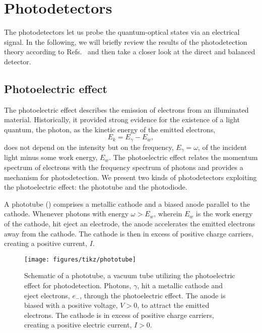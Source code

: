 \section{Photodetectors}\label{sec:photodetectors}

The photodetectors let us probe the quantum-optical states via an electrical signal.
In the following, we will briefly review the results of the photodetection theory according to Refs.~\cite{Mandel1995,Wolf2021} and then take a closer look at the direct and balanced detector.

\subsection{Photoelectric effect}

The photoelectric effect describes the emission of electrons from an illuminated material.
Historically, it provided strong evidence for the existence of a light quantum, the photon, as the kinetic energy of the emitted electrons,
\begin{equation}
	E_k
	=
	E_\gamma
	-
	E_w
	\label{eq:photoelectric_effect}
	,
\end{equation}
does not depend on the intensity but on the frequency, $E_\gamma=\omega$, of the incident light minus some work energy, $E_w$.
The photoelectric effect relates the momentum spectrum of electrons with the frequency spectrum of photons and provides a mechanism for photodetection.
We present two kinds of photodetectors exploiting the photoelectric effect: the phototube and the photodiode.

A phototube () comprises a metallic cathode and a biased anode parallel to the cathode.
Whenever photons with energy $\omega>E_w$, wherein $E_w$ is the work energy of the cathode, hit eject an electrode, the anode accelerates the emitted electrons away from the cathode.
The cathode is then in excess of positive charge carriers, creating a positive current, $I$.
\begin{figure}[htb]
    \centering
    \texttt{[image: figures/tikz/phototube]}
    \caption{Schematic of a phototube, a vacuum tube utilizing the photoelectric effect for photodetection. Photons, $\gamma$, hit a metallic cathode and eject electrons, $e_-$, through the photoelectric effect. The anode is biased with a positive voltage, $V>0$, to attract the emitted electrons. The cathode is in excess of positive charge carriers, creating a positive electric current, $I>0$.}\label{fig:phototube}
\end{figure}

